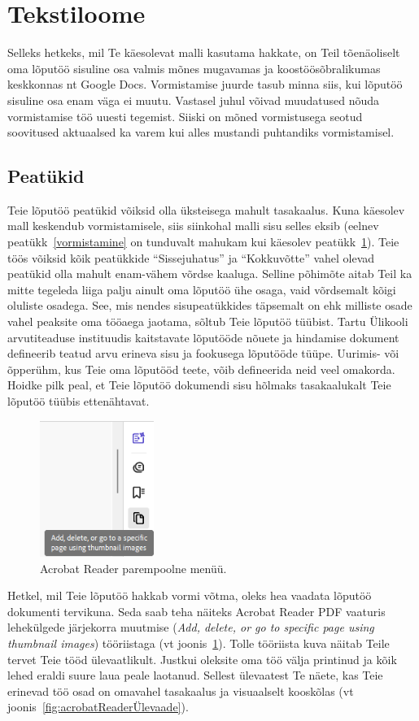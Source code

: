 \section{Tekstiloome} \label{tekstiloome}
Selleks hetkeks, mil Te käesolevat malli kasutama hakkate, on Teil tõenäoliselt oma lõputöö sisuline osa valmis mõnes mugavamas ja koostöösõbralikumas keskkonnas nt Google Docs. Vormistamise juurde tasub minna siis, kui lõputöö sisuline osa enam väga ei muutu. Vastasel juhul võivad muudatused nõuda vormistamise töö uuesti tegemist. Siiski on mõned vormistusega seotud soovitused aktuaalsed ka varem kui alles mustandi puhtandiks vormistamisel.

\subsection{Peatükid}
Teie lõputöö peatükid võiksid olla üksteisega mahult tasakaalus. Kuna käesolev mall keskendub vormistamisele, siis siinkohal malli sisu selles eksib (eelnev peatükk~\ref{vormistamine} on tunduvalt mahukam kui käesolev peatükk~\ref{tekstiloome}). Teie töös võiksid kõik peatükkide “Sissejuhatus” ja “Kokkuvõtte” vahel olevad peatükid olla mahult enam-vähem võrdse kaaluga. Selline põhimõte aitab Teil ka mitte tegeleda liiga palju ainult oma lõputöö ühe osaga, vaid võrdsemalt kõigi oluliste osadega. See, mis nendes sisupeatükkides täpsemalt on ehk milliste osade vahel peaksite oma tööaega jaotama, sõltub Teie lõputöö tüübist. Tartu Ülikooli arvutiteaduse instituudis kaitstavate lõputööde nõuete ja hindamise dokument defineerib teatud arvu erineva sisu ja fookusega lõputööde tüüpe. Uurimis- või õpperühm, kus Teie oma lõputööd teete, võib defineerida neid veel omakorda. Hoidke pilk peal, et Teie lõputöö dokumendi sisu hõlmaks tasakaalukalt Teie lõputöö tüübis ettenähtavat.

\begin{figure}
    \centering
    \includegraphics[width=0.33\textwidth]{joonised/Joonis5-AcrobatReaderMenüü.png}
    \caption{Acrobat Reader parempoolne menüü.}
    \label{fig:acrobatReaderMenüü}
\end{figure}
Hetkel, mil Teie lõputöö hakkab vormi võtma, oleks hea vaadata lõputöö dokumenti tervikuna. Seda saab teha näiteks Acrobat Reader PDF vaaturis lehekülgede järjekorra muutmise (\emph{Add, delete, or go to specific page using thumbnail images}) tööriistaga (vt joonis~\ref{fig:acrobatReaderMenüü}). Tolle tööriista kuva näitab Teile tervet Teie tööd ülevaatlikult. Justkui oleksite oma töö välja printinud ja kõik lehed eraldi suure laua peale laotanud. Sellest ülevaatest Te näete, kas Teie erinevad töö osad on omavahel tasakaalus ja visuaalselt kooskõlas (vt joonis~\ref{fig:acrobatReaderÜlevaade}).

